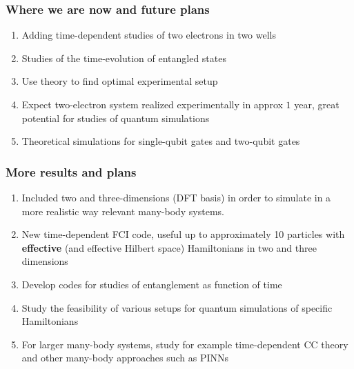 \documentclass{beamer}
\begin{document}
\begin{frame}
\frametitle{Where we are now and future plans}

\begin{enumerate}
\item Adding time-dependent studies of two electrons in two wells

\item Studies of the time-evolution of entangled states

\item Use theory to find optimal experimental setup

\item Expect two-electron system realized experimentally in approx $1$ year, great potential for studies of quantum simulations

\item Theoretical simulations for single-qubit gates and two-qubit gates  
\end{enumerate}

\noindent
\end{frame}

\begin{frame}
\frametitle{More results and plans}

\begin{enumerate}
\item Included  two and three-dimensions (DFT basis) in order to simulate in  a more realistic way relevant many-body systems.

\item New time-dependent FCI code, useful up to approximately 10 particles with \textbf{effective} (and effective Hilbert space) Hamiltonians in two and three dimensions

\item Develop codes for studies of entanglement as function of time


\item Study the feasibility of various setups for quantum simulations of specific Hamiltonians

\item For larger many-body systems, study for example time-dependent CC theory and other many-body approaches  such as PINNs
\end{enumerate}

\noindent
\end{frame}
\end{document}
